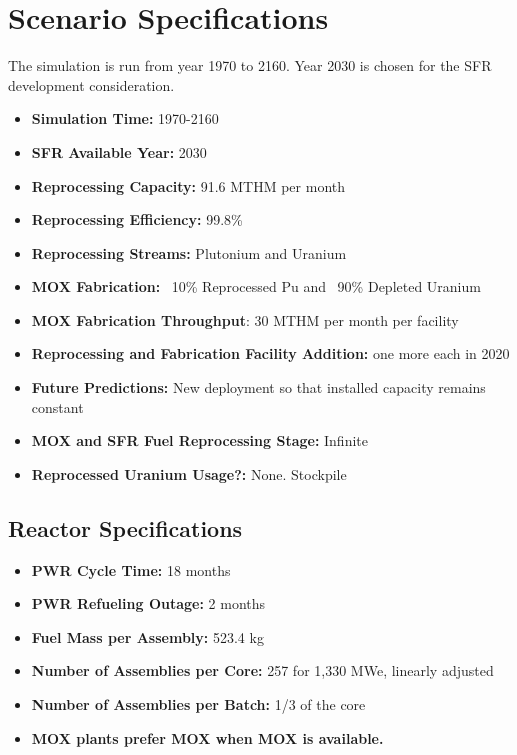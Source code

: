 \section{Scenario Specifications}

The simulation is run from year 1970 to 2160. Year 2030 is chosen for the 
SFR development consideration.

\begin{itemize}
	\item \textbf{Simulation Time:}  1970-2160 
	\item \textbf{\gls{SFR} Available Year:}  2030  
	\item \textbf{Reprocessing Capacity:}  91.6 MTHM per month \cite{schneider_spent_2008}  
	\item \textbf{Reprocessing Efficiency:}  99.8\%  
	\item \textbf{Reprocessing Streams:}  Plutonium and Uranium  
	\item \textbf{\gls{MOX} Fabrication:}  ~10\% Reprocessed Pu and ~90\% Depleted Uranium  
	\item \textbf{\gls{MOX} Fabrication Throughput}: 30 MTHM per month per facility \cite{hugelmann_melox_1999} 
	\item \textbf{Reprocessing and Fabrication Facility Addition:}  one more each in 2020  
	\item \textbf{Future Predictions:} New deployment so that installed capacity remains constant  
	\item \textbf{\gls{MOX} and \gls{SFR} Fuel Reprocessing Stage:}  Infinite  
	\item\textbf{Reprocessed Uranium Usage?:}  None. Stockpile \\
\end{itemize}

\subsection{Reactor Specifications}

\begin{itemize}
	\item \textbf{PWR Cycle Time:} 18 months  
	\item \textbf{PWR Refueling Outage:} 2 months  
	\item \textbf{Fuel Mass per Assembly:} 523.4 kg  
	\item \textbf{Number of Assemblies per Core:} 257 for 1,330 MWe, linearly adjusted  
	\item \textbf{Number of Assemblies per Batch:} 1/3 of the core  
	\item \textbf{\gls{MOX} plants prefer \gls{MOX} when \gls{MOX} is available.}
\end{itemize}
